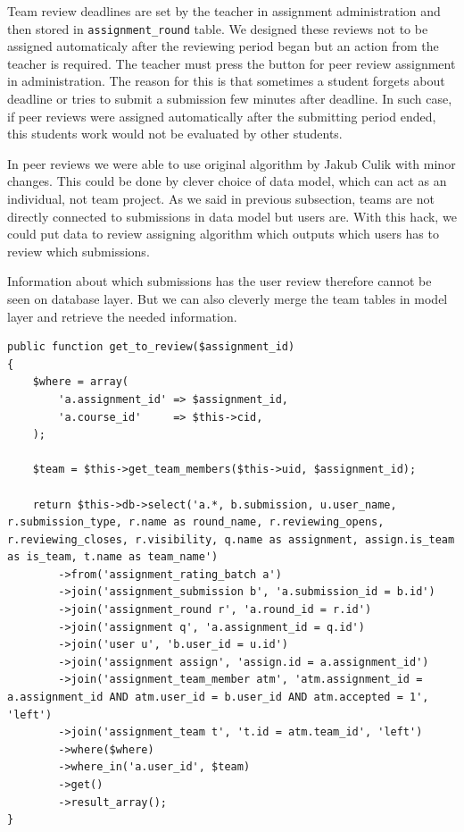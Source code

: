 Team review deadlines are set by the teacher in assignment administration and then stored in \texttt{assignment\_round} table. We designed these reviews not to be assigned automaticaly after the reviewing period began but an action from the teacher is required. The teacher must press the button for peer review assignment in administration. The reason for this is that sometimes a student forgets about deadline or tries to submit a submission few minutes after deadline. In such case, if peer reviews were assigned automatically after the submitting period ended, this students work would not be evaluated by other students.

In peer reviews we were able to use original algorithm by Jakub Culik \cite{culik} with minor changes. This could be done by clever choice of data model, which can act as an individual, not team project. As we said in previous subsection, teams are not directly connected to submissions in data model but users are. With this hack, we could put data to review assigning algorithm which outputs which users has to review which submissions.

Information about which submissions has the user review therefore cannot be seen on database layer. But we can also cleverly merge the team tables in model layer and retrieve the needed information.

\begin{lstlisting}[caption={Retrieving information about peer reviews},label={lst:peerreviewlisting}]
public function get_to_review($assignment_id)
{
    $where = array(
        'a.assignment_id' => $assignment_id,
        'a.course_id'     => $this->cid,
    );

    $team = $this->get_team_members($this->uid, $assignment_id);

    return $this->db->select('a.*, b.submission, u.user_name, r.submission_type, r.name as round_name, r.reviewing_opens, r.reviewing_closes, r.visibility, q.name as assignment, assign.is_team as is_team, t.name as team_name')
        ->from('assignment_rating_batch a')
        ->join('assignment_submission b', 'a.submission_id = b.id')
        ->join('assignment_round r', 'a.round_id = r.id')
        ->join('assignment q', 'a.assignment_id = q.id')
        ->join('user u', 'b.user_id = u.id')
        ->join('assignment assign', 'assign.id = a.assignment_id')
        ->join('assignment_team_member atm', 'atm.assignment_id = a.assignment_id AND atm.user_id = b.user_id AND atm.accepted = 1', 'left')
        ->join('assignment_team t', 't.id = atm.team_id', 'left')
        ->where($where)
        ->where_in('a.user_id', $team)
        ->get()
        ->result_array();
}
\end{lstlisting}

